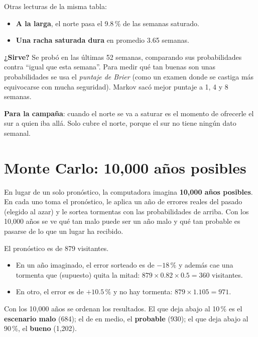 Otras lecturas de la misma tabla:
\begin{itemize}
\item \textbf{A la larga}, el norte pasa el 9.8\,\% de las semanas saturado.
\item \textbf{Una racha saturada dura} en promedio 3.65 semanas.
\end{itemize}

\textbf{¿Sirve?} Se probó en las últimas 52 semanas, comparando sus probabilidades contra ``igual que esta semana''. Para
medir qué tan buenas son unas probabilidades se usa el \emph{puntaje de Brier} (como un examen donde se castiga más
equivocarse con mucha seguridad). Markov sacó mejor puntaje a 1, 4 y 8 semanas.

\textbf{Para la campaña}: cuando el norte se va a saturar es el momento de ofrecerle el sur a quien iba allá. Solo cubre el
norte, porque el sur no tiene ningún dato semanal.

\section{Monte Carlo: 10,000 años posibles}
\begin{intuicion}
En lugar de un solo pronóstico, la computadora imagina \textbf{10,000 años posibles}. En cada uno toma el pronóstico, le
aplica un año de errores reales del pasado (elegido al azar) y le sortea tormentas con las probabilidades de arriba. Con
los 10,000 años se ve qué tan malo puede ser un año malo y qué tan probable es pasarse de lo que un lugar ha recibido.
\end{intuicion}

\begin{ejemplo}
El pronóstico es de 879 visitantes.
\begin{itemize}
\item En un año imaginado, el error sorteado es de $-18\,\%$ y además cae una tormenta que (supuesto) quita la mitad:
  $879\times0.82\times0.5=360$ visitantes.
\item En otro, el error es de $+10.5\,\%$ y no hay tormenta: $879\times1.105=971$.
\end{itemize}
Con los 10,000 años se ordenan los resultados. El que deja abajo al 10\,\% es el \textbf{escenario malo} (684); el de en
medio, el \textbf{probable} (930); el que deja abajo al 90\,\%, el \textbf{bueno} (1,202).
\end{ejemplo}

